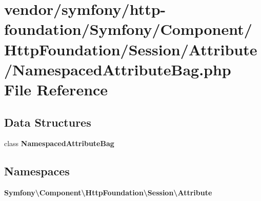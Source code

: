 \section{vendor/symfony/http-\/foundation/\+Symfony/\+Component/\+Http\+Foundation/\+Session/\+Attribute/\+Namespaced\+Attribute\+Bag.php File Reference}
\label{_namespaced_attribute_bag_8php}
\subsection*{Data Structures}
\begin{DoxyCompactItemize}
\item 
class {\bf Namespaced\+Attribute\+Bag}
\end{DoxyCompactItemize}
\subsection*{Namespaces}
\begin{DoxyCompactItemize}
\item 
 {\bf Symfony\textbackslash{}\+Component\textbackslash{}\+Http\+Foundation\textbackslash{}\+Session\textbackslash{}\+Attribute}
\end{DoxyCompactItemize}
